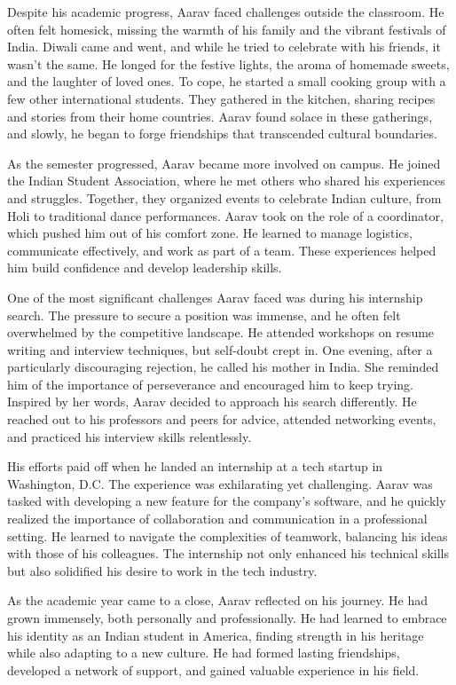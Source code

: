 \documentclass[11pt,addpoints,answers]{exam}
\begin{document}
\begin{questions}
\begin{tcolorbox}[fit,height=22cm, width=16cm, blank, borderline={1pt}{-2pt},nobeforeafter]
Despite his academic progress, Aarav faced challenges outside the classroom. He often felt homesick, missing the warmth of his family and the vibrant festivals of India. Diwali came and went, and while he tried to celebrate with his friends, it wasn’t the same. He longed for the festive lights, the aroma of homemade sweets, and the laughter of loved ones. To cope, he started a small cooking group with a few other international students. They gathered in the kitchen, sharing recipes and stories from their home countries. Aarav found solace in these gatherings, and slowly, he began to forge friendships that transcended cultural boundaries.

As the semester progressed, Aarav became more involved on campus. He joined the Indian Student Association, where he met others who shared his experiences and struggles. Together, they organized events to celebrate Indian culture, from Holi to traditional dance performances. Aarav took on the role of a coordinator, which pushed him out of his comfort zone. He learned to manage logistics, communicate effectively, and work as part of a team. These experiences helped him build confidence and develop leadership skills.

One of the most significant challenges Aarav faced was during his internship search. The pressure to secure a position was immense, and he often felt overwhelmed by the competitive landscape. He attended workshops on resume writing and interview techniques, but self-doubt crept in. One evening, after a particularly discouraging rejection, he called his mother in India. She reminded him of the importance of perseverance and encouraged him to keep trying. Inspired by her words, Aarav decided to approach his search differently. He reached out to his professors and peers for advice, attended networking events, and practiced his interview skills relentlessly.

His efforts paid off when he landed an internship at a tech startup in Washington, D.C. The experience was exhilarating yet challenging. Aarav was tasked with developing a new feature for the company’s software, and he quickly realized the importance of collaboration and communication in a professional setting. He learned to navigate the complexities of teamwork, balancing his ideas with those of his colleagues. The internship not only enhanced his technical skills but also solidified his desire to work in the tech industry.

As the academic year came to a close, Aarav reflected on his journey. He had grown immensely, both personally and professionally. He had learned to embrace his identity as an Indian student in America, finding strength in his heritage while also adapting to a new culture. He had formed lasting friendships, developed a network of support, and gained valuable experience in his field.


\end{tcolorbox}
\end{questions}
\end{document}

